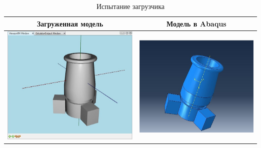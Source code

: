\documentclass[14pt,oneside,final]{extreport}
\begin{document}
	\begin{table}[]
		\centering
		\caption{Испытание загрузчика}
		\label{tab:loader-tests}{
		{\tabulinesep=1.2mm
		\begin{tabu}[]{|c|c|}
				\hline
				Загруженная модель 							   & Модель в Abaqus  \\
				\hline
				\rule{0pt}{4ex} \includegraphics[scale=0.40]{img/loader-test1} & \includegraphics[scale=0.43]{img/loader-test1-abq}  \\ 

\end{tabu}}}
\end{table}
\end{document}

